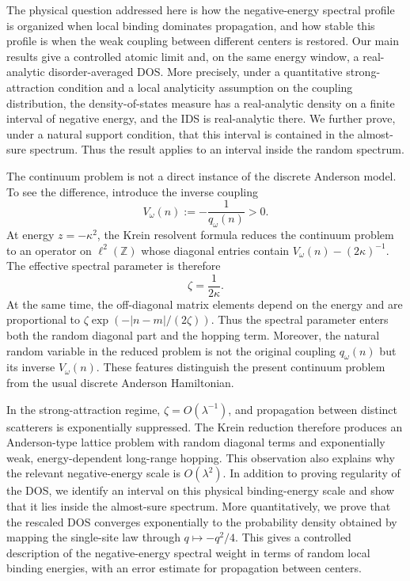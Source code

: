 \documentclass[12pt,a4paper]{article}
\numberwithin{equation}{section}
\newcommand{\Z}{\mathbb Z}
\begin{document}
The physical question addressed here is how the negative-energy spectral
profile is organized when local binding dominates propagation, and how stable
this profile is when the weak coupling between different centers is restored.
Our main results give a controlled atomic limit and, on the same energy
window, a real-analytic disorder-averaged DOS.  More precisely, under a
quantitative strong-attraction condition and a local analyticity assumption on
the coupling distribution, the density-of-states measure has a real-analytic
density on a finite interval of negative energy, and the IDS is real-analytic
there.  We further prove, under a natural support condition, that this
interval is contained in the almost-sure spectrum.  Thus the result applies to an interval inside the random spectrum.

The continuum problem is not a direct instance of the discrete Anderson model.
To see the difference, introduce the inverse coupling
\begin{equation}
V_\omega(n):=-\frac{1}{q_\omega(n)}>0.
\label{intro-inverse-coupling}
\end{equation}
At energy $z=-\kappa^2$, the Krein resolvent formula reduces the continuum
problem to an operator on $\ell^2(\Z)$ whose diagonal entries contain
$V_\omega(n)-(2\kappa)^{-1}$.  The effective spectral parameter is therefore
\begin{equation}
\zeta=\frac{1}{2\kappa}.
\label{intro-zeta}
\end{equation}
At the same time, the off-diagonal matrix elements depend on the energy and
are proportional to
$\zeta\exp(-|n-m|/(2\zeta))$.  Thus the spectral parameter enters both the
random diagonal part and the hopping term.  Moreover, the natural random
variable in the reduced problem is not the original coupling $q_\omega(n)$
but its inverse $V_\omega(n)$.  These features distinguish the present
continuum problem from the usual discrete Anderson Hamiltonian.

In the strong-attraction regime, $\zeta=O(\lambda^{-1})$, and propagation
between distinct scatterers is exponentially suppressed.  The Krein
reduction therefore produces an Anderson-type lattice problem with random
diagonal terms and exponentially weak, energy-dependent long-range hopping.
This observation also explains why the relevant negative-energy scale is
$O(\lambda^2)$.  In addition to proving regularity of the DOS, we identify an
interval on this physical binding-energy scale and show that it lies inside
the almost-sure spectrum.  More quantitatively, we prove that the rescaled DOS
converges exponentially to the probability density obtained by mapping the
single-site law through $q\mapsto-q^2/4$.  This gives a controlled description
of the negative-energy spectral weight in terms of random local binding
energies, with an error estimate for propagation between centers.
\end{document}
